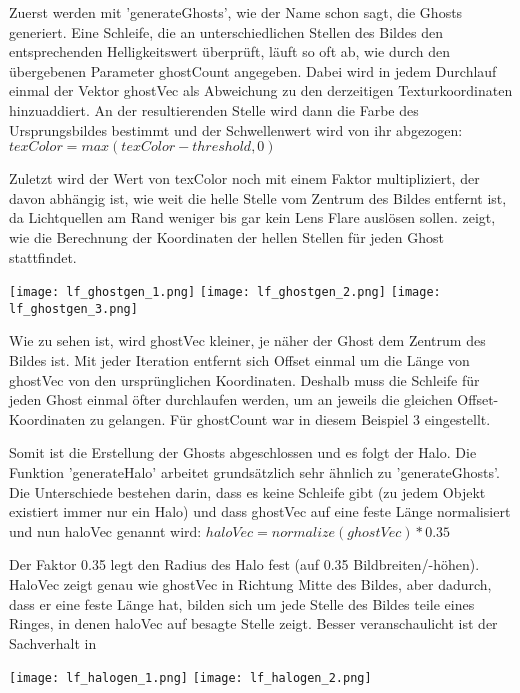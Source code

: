 Zuerst werden mit 'generateGhosts', wie der Name schon sagt, die Ghosts generiert. Eine Schleife, die an unterschiedlichen Stellen des Bildes den entsprechenden Helligkeitswert überprüft, läuft so oft ab, wie durch den übergebenen Parameter ghostCount angegeben. Dabei wird in jedem Durchlauf einmal der Vektor ghostVec als Abweichung zu den derzeitigen Texturkoordinaten hinzuaddiert. An der resultierenden Stelle wird dann die Farbe des Ursprungsbildes bestimmt und der Schwellenwert wird von ihr abgezogen: $texColor = max(texColor - threshold, 0)$

Zuletzt wird der Wert von texColor noch mit einem Faktor multipliziert, der davon abhängig ist, wie weit die helle Stelle vom Zentrum des Bildes entfernt ist, da Lichtquellen am Rand weniger bis gar kein Lens Flare auslösen sollen.  zeigt, wie die Berechnung der Koordinaten der hellen Stellen für jeden Ghost stattfindet.

\captionsetup{type=figure}
\texttt{[image: lf\_ghostgen\_1.png]}
\texttt{[image: lf\_ghostgen\_2.png]}
\texttt{[image: lf\_ghostgen\_3.png]}
\label{img:lfghostgen}

Wie zu sehen ist, wird ghostVec kleiner, je näher der Ghost dem Zentrum des Bildes ist. Mit jeder Iteration entfernt sich Offset einmal um die Länge von ghostVec von den ursprünglichen Koordinaten. Deshalb muss die Schleife für jeden Ghost einmal öfter durchlaufen werden, um an jeweils die gleichen Offset-Koordinaten zu gelangen. Für ghostCount war in diesem Beispiel 3 eingestellt.

Somit ist die Erstellung der Ghosts abgeschlossen und es folgt der Halo. Die Funktion 'generateHalo' arbeitet grundsätzlich sehr ähnlich zu 'generateGhosts'. Die Unterschiede bestehen darin, dass es keine Schleife gibt (zu jedem Objekt existiert immer nur ein Halo) und dass ghostVec auf eine feste Länge normalisiert und nun haloVec genannt wird: $haloVec = normalize(ghostVec) * 0.35$

Der Faktor 0.35 legt den Radius des Halo fest (auf 0.35 Bildbreiten/-höhen). HaloVec zeigt genau wie ghostVec in Richtung Mitte des Bildes, aber dadurch, dass er eine feste Länge hat, bilden sich um jede Stelle des Bildes teile eines Ringes, in denen haloVec auf besagte Stelle zeigt. Besser veranschaulicht ist der Sachverhalt in 

\captionsetup{type=figure}
\texttt{[image: lf\_halogen\_1.png]}
\texttt{[image: lf\_halogen\_2.png]}
\label{img:lfhalogen}

